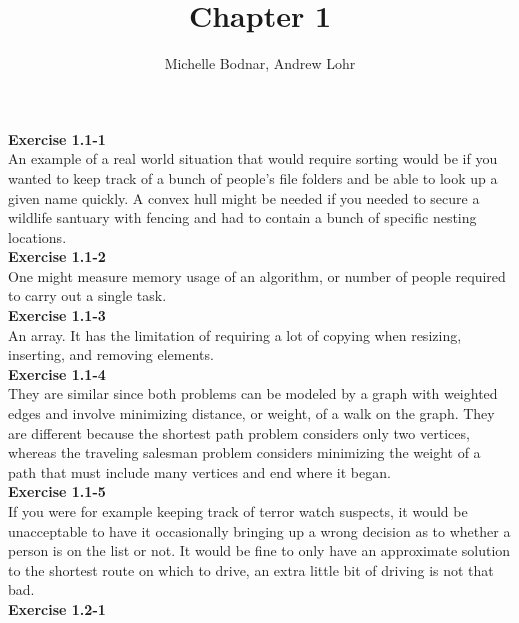 \documentclass{article}
\title{Chapter 1}
\author{Michelle Bodnar, Andrew Lohr}
\begin{document}
\maketitle

\noindent\textbf{Exercise 1.1-1}\\

An example of a real world situation that would require sorting would be if you wanted to keep track of a bunch of people's file folders and be able to look up a given name quickly. A convex hull might be needed if you needed to secure a wildlife santuary with fencing and had to contain a bunch of specific nesting locations.\\



\noindent\textbf{Exercise 1.1-2}\\

One might measure memory usage of an algorithm, or number of people required to carry out a single task.\\


\noindent\textbf{Exercise 1.1-3} \\

An array. It has the limitation of requiring a lot of copying when resizing, inserting, and removing elements. \\

\noindent\textbf{Exercise 1.1-4} \\

They are similar since both problems can be modeled by a graph with weighted edges and involve minimizing distance, or weight, of a walk on the graph.  They are different because the shortest path problem considers only two vertices, whereas the traveling salesman problem considers minimizing the weight of a path that must include many vertices and end where it began. \\

\noindent\textbf{Exercise 1.1-5} \\

If you were for example keeping track of terror watch suspects, it would be unacceptable to have it occasionally bringing up a wrong decision as to whether a person is on the list or not. It would be fine to only have an approximate solution to the shortest route on which to drive, an extra little bit of driving is not that bad. \\

\noindent\textbf{Exercise 1.2-1} \\
\end{document}
